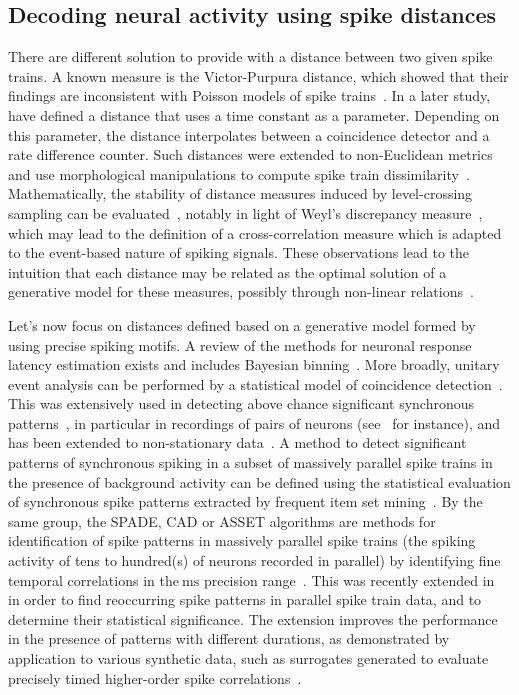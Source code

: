 \documentclass[brainsci, %
               review,submit,pdftex,moreauthors
               ]{Definitions/mdpi}
\newcommand{\ms}{\si{\milli\second}}%
\begin{document}
\subsection{Decoding neural activity using spike distances}\label{sec:detection}
There are different solution to provide with a distance between two given spike trains. A known measure is the Victor-Purpura distance, which showed that their findings are inconsistent with Poisson models of spike trains~\citep{victor_nature_1996}. In a later study,~\citet{van_rossum_novel_2001} have defined a distance that uses a time constant as a parameter. Depending on this parameter, the distance interpolates between a coincidence detector and a rate difference counter. Such distances were extended to non-Euclidean metrics and use morphological manipulations to compute spike train dissimilarity~\citet{kreuz_measuring_2007}. Mathematically, the stability of distance measures induced by level-crossing sampling can be evaluated~\citep{moser_stability_2014}, notably in light of Weyl's discrepancy measure~\citep{weyl_ueber_1916}, which may lead to the definition of a cross-correlation measure which is adapted to the event-based nature of spiking signals. These observations lead to the intuition that each distance may be related as the optimal solution of a generative model for these measures, possibly through non-linear relations~\citep{aronov_non-euclidean_2004}. %

Let's now focus on distances defined based on a generative model formed by using precise spiking motifs. A review of the methods for neuronal response latency estimation exists and includes Bayesian binning~\citep{levakova_review_2015}. More broadly, unitary event analysis can be performed by a statistical model of coincidence detection~\citep{grun_unitary_2002-1}. This was extensively used in detecting above chance significant synchronous patterns~\citep{grun_unitary_2010}, in particular in recordings of pairs of neurons (see~\citep{riehle_spike_1997} for instance), and has been extended to non-stationary data~\citep{grun_unitary_2002}. A method to detect significant patterns of synchronous spiking in a subset of massively parallel spike trains in the presence of background activity can be defined using the statistical evaluation of synchronous spike patterns extracted by frequent item set mining~\citep{torre_statistical_2013}. By the same group, the SPADE, CAD or ASSET algorithms are methods for identification of spike patterns in massively parallel spike trains (the spiking activity of tens to hundred(s) of neurons recorded in parallel) by identifying fine temporal correlations in the$~\ms$ precision range~\citep{quaglio_methods_2018}. This was recently extended in~\citep{stella_3d-spade_2019} in order to find reoccurring spike patterns in parallel spike train data, and to determine their statistical significance. The extension improves the performance in the presence of patterns with different durations, as demonstrated by application to various synthetic data, such as surrogates generated to evaluate precisely timed higher-order spike correlations~\citep{stella_comparing_2022}.
\end{document}

